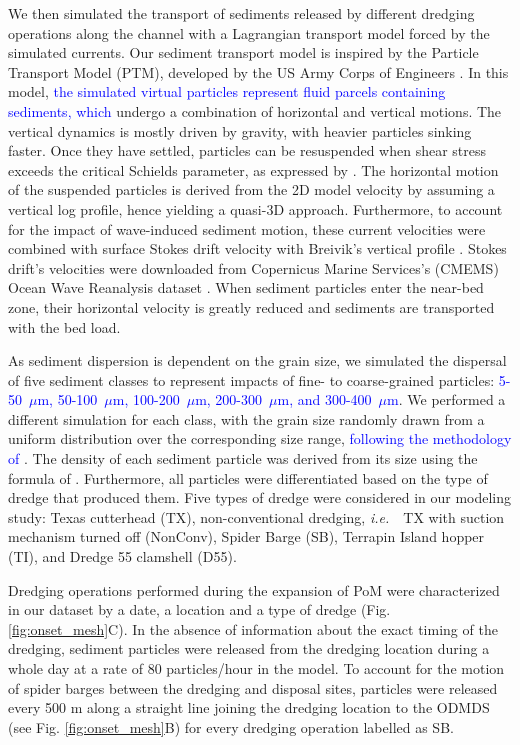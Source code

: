 \documentclass[preprint,12pt,authoryear]{elsarticle}
\newcommand{\ie}{{\it i.e.}\ }
\newcommand{\modif}[1]{\textcolor{blue}{#1}}
\begin{document}
We then simulated the transport of sediments released by different dredging operations along the channel with a Lagrangian transport model forced by the simulated currents. Our sediment transport model is inspired by the Particle Transport Model (PTM), developed by the US Army Corps of Engineers \citep{macdonald2006ptm}. In this model, \modif{the simulated virtual particles represent fluid parcels containing sediments, which} undergo a combination of horizontal and vertical motions. The vertical dynamics is mostly driven by gravity, with heavier particles sinking faster. Once they have settled, particles can be resuspended when shear stress exceeds the critical Schields parameter, as expressed by \cite{soulsby1997threshold}. The horizontal motion of the suspended particles is derived from the 2D model velocity by assuming a vertical log profile, hence yielding a quasi-3D approach. Furthermore, to account for the impact of wave-induced sediment motion, these current velocities were combined with surface Stokes drift velocity with Breivik's vertical profile \citep{breivik2016stokes}. Stokes drift's velocities were downloaded from Copernicus Marine Services's (CMEMS) Ocean Wave Reanalysis dataset \citep{cmems}. When sediment particles enter the near-bed zone, their horizontal velocity is greatly reduced and sediments are transported with the bed load.

As sediment dispersion is dependent on the grain size, we simulated the dispersal of five sediment classes to represent impacts of fine- to coarse-grained particles:  \modif{5-50~$\mu$m, 50-100~$\mu$m, 100-200~$\mu$m, 200-300~$\mu$m, and 300-400~$\mu$m}. We performed a  different simulation for each class, with the grain size randomly drawn from a uniform distribution over the corresponding size range, \modif{following the methodology of \cite{saint2022quantifying}}. The density of each sediment particle was derived from its size using the formula of \cite{hamilton1982sound}. Furthermore, all particles were differentiated based on the type of dredge that produced them. Five types of dredge were considered in our modeling study: Texas cutterhead (TX), non-conventional dredging, \ie~TX with suction mechanism turned off (NonConv), Spider Barge (SB), Terrapin Island hopper (TI), and Dredge 55 clamshell (D55).

Dredging operations performed during the expansion of PoM were characterized in our dataset by a date, a location and a type of dredge (Fig. \ref{fig:onset_mesh}C). In the absence of information about the exact timing of the dredging, sediment particles were released from the dredging location during a whole day at a rate of 80 particles/hour in the model. To account for the motion of spider barges between the dredging and disposal sites, particles were released every 500 m along a straight line joining the dredging location to the ODMDS (see Fig. \ref{fig:onset_mesh}B) for every dredging operation labelled as SB.
\end{document}
